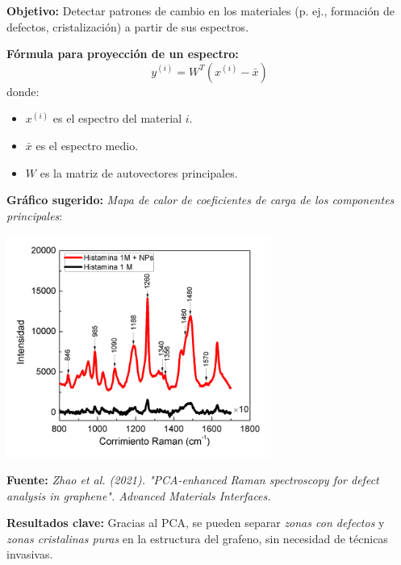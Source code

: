 \documentclass[12pt]{article}
\begin{document}
        \noindent
        \textbf{Objetivo:} Detectar patrones de cambio en los materiales (p. ej., formación de defectos, cristalización) a partir de sus espectros.
        
        \vspace{1em}
        \noindent
        \textbf{Fórmula para proyección de un espectro:}
        \[
        y^{(i)} = W^T (x^{(i)} - \bar{x})
        \]
        donde:
        \begin{itemize}
                \item $ x^{(i)} $ es el espectro del material $ i $.
                \item $ \bar{x} $ es el espectro medio.
                \item $ W $ es la matriz de autovectores principales.
        \end{itemize}
        
        \vspace{1em}
        \noindent
        \textbf{Gráfico sugerido:} \emph{Mapa de calor de coeficientes de carga de los componentes principales}:
        \begin{center}
                \includegraphics[width=0.65\textwidth]{imagenes/pca_raman_heatmap.png}
        \end{center}
        
        \noindent
        \textbf{Fuente:} \emph{Zhao et al. (2021). "PCA-enhanced Raman spectroscopy for defect analysis in graphene". Advanced Materials Interfaces.}
        
        \vspace{1em}
        \noindent
        \textbf{Resultados clave:} Gracias al PCA, se pueden separar \emph{zonas con defectos} y \emph{zonas cristalinas puras} en la estructura del grafeno, sin necesidad de técnicas invasivas.
        
\end{document}
